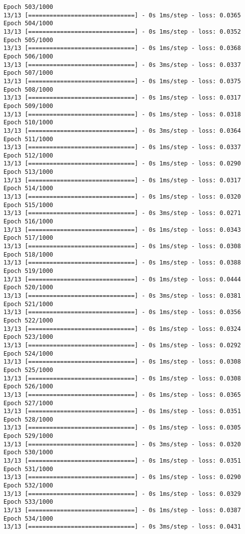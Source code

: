 \documentclass[11pt]{article}
\begin{document}
\begin{Verbatim}[commandchars=\\\{\}]
Epoch 503/1000
13/13 [==============================] - 0s 1ms/step - loss: 0.0365
Epoch 504/1000
13/13 [==============================] - 0s 1ms/step - loss: 0.0352
Epoch 505/1000
13/13 [==============================] - 0s 1ms/step - loss: 0.0368
Epoch 506/1000
13/13 [==============================] - 0s 3ms/step - loss: 0.0337
Epoch 507/1000
13/13 [==============================] - 0s 1ms/step - loss: 0.0375
Epoch 508/1000
13/13 [==============================] - 0s 1ms/step - loss: 0.0317
Epoch 509/1000
13/13 [==============================] - 0s 1ms/step - loss: 0.0318
Epoch 510/1000
13/13 [==============================] - 0s 3ms/step - loss: 0.0364
Epoch 511/1000
13/13 [==============================] - 0s 1ms/step - loss: 0.0337
Epoch 512/1000
13/13 [==============================] - 0s 1ms/step - loss: 0.0290
Epoch 513/1000
13/13 [==============================] - 0s 1ms/step - loss: 0.0317
Epoch 514/1000
13/13 [==============================] - 0s 1ms/step - loss: 0.0320
Epoch 515/1000
13/13 [==============================] - 0s 3ms/step - loss: 0.0271
Epoch 516/1000
13/13 [==============================] - 0s 1ms/step - loss: 0.0343
Epoch 517/1000
13/13 [==============================] - 0s 1ms/step - loss: 0.0308
Epoch 518/1000
13/13 [==============================] - 0s 1ms/step - loss: 0.0388
Epoch 519/1000
13/13 [==============================] - 0s 1ms/step - loss: 0.0444
Epoch 520/1000
13/13 [==============================] - 0s 3ms/step - loss: 0.0381
Epoch 521/1000
13/13 [==============================] - 0s 1ms/step - loss: 0.0356
Epoch 522/1000
13/13 [==============================] - 0s 1ms/step - loss: 0.0324
Epoch 523/1000
13/13 [==============================] - 0s 1ms/step - loss: 0.0292
Epoch 524/1000
13/13 [==============================] - 0s 1ms/step - loss: 0.0308
Epoch 525/1000
13/13 [==============================] - 0s 1ms/step - loss: 0.0308
Epoch 526/1000
13/13 [==============================] - 0s 1ms/step - loss: 0.0365
Epoch 527/1000
13/13 [==============================] - 0s 1ms/step - loss: 0.0351
Epoch 528/1000
13/13 [==============================] - 0s 1ms/step - loss: 0.0305
Epoch 529/1000
13/13 [==============================] - 0s 3ms/step - loss: 0.0320
Epoch 530/1000
13/13 [==============================] - 0s 1ms/step - loss: 0.0351
Epoch 531/1000
13/13 [==============================] - 0s 1ms/step - loss: 0.0290
Epoch 532/1000
13/13 [==============================] - 0s 1ms/step - loss: 0.0329
Epoch 533/1000
13/13 [==============================] - 0s 1ms/step - loss: 0.0387
Epoch 534/1000
13/13 [==============================] - 0s 3ms/step - loss: 0.0431

\end{Verbatim}
\end{document}
